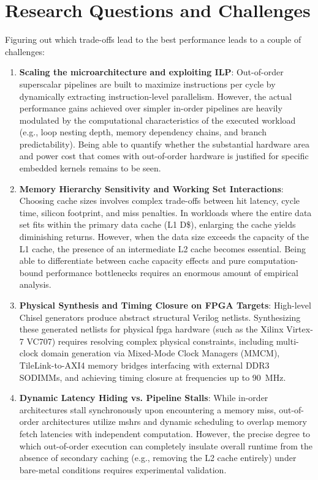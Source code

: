\section{Research Questions and Challenges}
\label{sec:challenges_and_rqs}

Figuring out which trade-offs lead to the best performance leads to a couple of challenges:

\begin{enumerate}
    \item \textbf{Scaling the microarchitecture and exploiting ILP}: Out-of-order superscalar pipelines are built to maximize instructions per cycle by dynamically extracting instruction-level parallelism. 
      However, the actual performance gains achieved over simpler in-order pipelines are heavily modulated by the computational characteristics of the executed workload 
      (e.g., loop nesting depth, memory dependency chains, and branch predictability). 
      Being able to quantify whether the substantial hardware area and power cost that comes with out-of-order hardware is justified for specific embedded kernels remains to be seen.
    \item \textbf{Memory Hierarchy Sensitivity and Working Set Interactions}: Choosing cache sizes involves complex trade-offs between hit latency, cycle time, silicon footprint, and miss penalties. 
      In workloads where the entire data set fits within the primary data cache (L1 D\$), enlarging the cache yields diminishing returns. 
      However, when the data size exceeds the capacity of the L1 cache, the presence of an intermediate L2 cache becomes essential. 
      Being able to differentiate between cache capacity effects and pure computation-bound performance bottlenecks requires an enormous amount of empirical analysis.
    \item \textbf{Physical Synthesis and Timing Closure on FPGA Targets}: High-level Chisel generators produce abstract structural Verilog netlists. 
      Synthesizing these generated netlists for physical \gls{fpga} hardware (such as the Xilinx Virtex-7 VC707) requires resolving complex physical constraints, 
      including multi-clock domain generation via Mixed-Mode Clock Managers (MMCM), TileLink-to-AXI4 memory bridges interfacing with external DDR3 SODIMMs, 
      and achieving timing closure at frequencies up to 90~MHz.
    \item \textbf{Dynamic Latency Hiding vs. Pipeline Stalls}: While in-order architectures stall synchronously upon encountering a memory miss, 
      out-of-order architectures utilize \glspl{mshr} and dynamic scheduling to overlap memory fetch latencies with independent computation. 
      However, the precise degree to which out-of-order execution can completely insulate overall runtime from the absence of secondary caching 
      (e.g., removing the L2 cache entirely) under bare-metal conditions requires experimental validation.
\end{enumerate}

